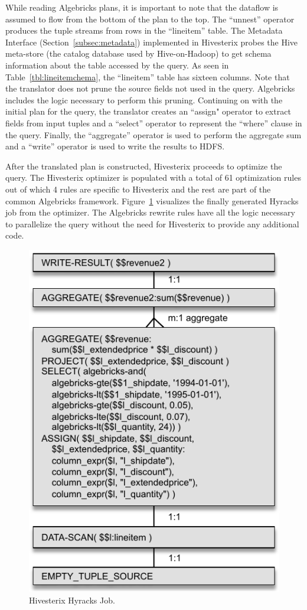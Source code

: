 While reading Algebricks plans, it is important to note that the dataflow is assumed to flow from the bottom of the plan to the top. 
The ``unnest'' operator produces the tuple streams from rows in the ``lineitem'' table. 
The Metadata Interface (Section~\ref{subsec:metadata}) implemented in Hivesterix probes the Hive meta-store (the catalog database used by Hive-on-Hadoop) to get schema information about the table accessed by the query. 
As seen in Table~\ref{tbl:lineitemchema}, the ``lineitem'' table has sixteen columns. 
Note that the translator does not prune the source fields not used in the query.  
Algebricks includes the logic necessary to perform this pruning. 
Continuing on with the initial plan for the query, the translator creates an ``assign" operator to extract fields from input tuples and a ``select'' operator to represent the ``where'' clause in the query. 
Finally, the ``aggregate'' operator is used to perform the aggregate sum and a ``write'' operator is used to write the results to HDFS. 

After the translated plan is constructed, Hivesterix proceeds to optimize the query.
The Hivesterix optimizer is populated with a total of 61 optimization rules out of which 4 rules are specific to Hivesterix and the rest are part of the common Algebricks framework. 
Figure~\ref{fig:hivestrix_hyracks_job} visualizes the finally generated Hyracks job from the optimizer.
The Algebricks rewrite rules have all the logic necessary to parallelize the query without the need for Hivesterix to provide any additional code. 


\begin{figure}[!ht]
\vspace{-.8ex}
\centering
\includegraphics[width=0.70\columnwidth]{images/hivestrix_hyracks_job}
\vspace{-1ex}
\caption{Hivesterix Hyracks Job.}
\vspace{-.8ex}
\label{fig:hivestrix_hyracks_job}
\end{figure}


